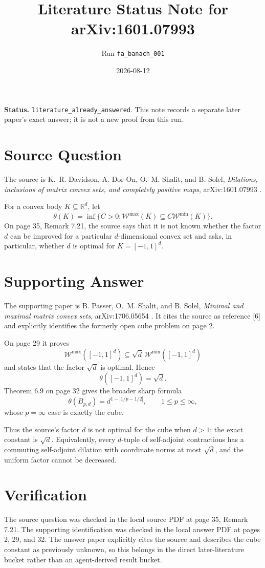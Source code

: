 \documentclass[11pt]{article}
\title{Literature Status Note for arXiv:1601.07993}
\author{Run \texttt{fa\_banach\_001}}
\date{2026-08-12}
\begin{document}
\maketitle

\noindent\textbf{Status.}
\texttt{literature\_already\_answered}. This note records a separate later
paper's exact answer; it is not a new proof from this run.

\section*{Source Question}
The source is K.~R. Davidson, A. Dor-On, O.~M. Shalit, and B. Solel,
\emph{Dilations, inclusions of matrix convex sets, and completely positive
maps}, arXiv:1601.07993 \cite{DDOSS}.

For a convex body $K\subseteq\mathbb R^d$, let
\[
 \theta(K)=\inf\{C>0:\mathcal W^{\max}(K)
 \subseteq C\mathcal W^{\min}(K)\}.
\]
On page 35, Remark 7.21, the source says that it is not known whether the
factor $d$ can be improved for a particular $d$-dimensional convex set and
asks, in particular, whether $d$ is optimal for $K=[-1,1]^d$.

\section*{Supporting Answer}
The supporting paper is B. Passer, O.~M. Shalit, and B. Solel,
\emph{Minimal and maximal matrix convex sets}, arXiv:1706.05654
\cite{PSS}. It cites the source as reference [6] and explicitly identifies
the formerly open cube problem on page 2.

On page 29 it proves
\[
 \mathcal W^{\max}([-1,1]^d)
 \subseteq \sqrt d\,\mathcal W^{\min}([-1,1]^d)
\]
and states that the factor $\sqrt d$ is optimal. Hence
\[
 \boxed{\theta([-1,1]^d)=\sqrt d.}
\]
Theorem 6.9 on page 32 gives the broader sharp formula
\[
 \theta(B_{p,d})=d^{1-|1/p-1/2|},\qquad 1\leq p\leq\infty,
\]
whose $p=\infty$ case is exactly the cube.

Thus the source's factor $d$ is not optimal for the cube when $d>1$; the
exact constant is $\sqrt d$. Equivalently, every $d$-tuple of self-adjoint
contractions has a commuting self-adjoint dilation with coordinate norms at
most $\sqrt d$, and the uniform factor cannot be decreased.

\section*{Verification}
The source question was checked in the local source PDF at page 35,
Remark 7.21. The supporting identification was checked in the local answer
PDF at pages 2, 29, and 32. The answer paper explicitly cites the source and
describes the cube constant as previously unknown, so this belongs in the
direct later-literature bucket rather than an agent-derived result bucket.
\end{document}
